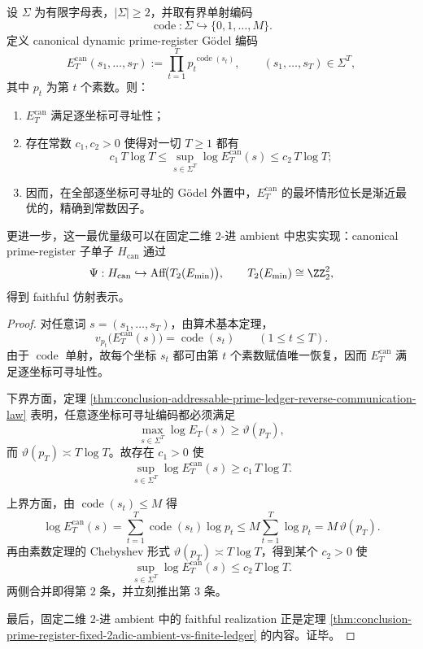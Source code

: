 \begin{theorem}\label{thm:conclusion-canonical-dynamic-prime-register-asymptotic-optimality}
设 \(\Sigma\) 为有限字母表，\(|\Sigma|\ge 2\)，并取有界单射编码
\[
\operatorname{code}:\Sigma\hookrightarrow \{0,1,\dots,M\}.
\]
定义 canonical dynamic prime-register Gödel 编码
\[
E_T^{\mathrm{can}}(s_1,\dots,s_T)
:=
\prod_{t=1}^{T}p_t^{\,\operatorname{code}(s_t)},
\qquad
(s_1,\dots,s_T)\in \Sigma^T,
\]
其中 \(p_t\) 为第 \(t\) 个素数。则：
\begin{enumerate}
  \item \(E_T^{\mathrm{can}}\) 满足逐坐标可寻址性；
  \item 存在常数 \(c_1,c_2>0\) 使得对一切 \(T\ge 1\) 都有
  \[
  c_1\,T\log T
  \le
  \sup_{s\in\Sigma^T}\log E_T^{\mathrm{can}}(s)
  \le
  c_2\,T\log T;
  \]
  \item 因而，在全部逐坐标可寻址的 Gödel 外置中，\(E_T^{\mathrm{can}}\) 的最坏情形位长是渐近最优的，精确到常数因子。
\end{enumerate}
更进一步，这一最优量级可以在固定二维 \(2\)-进 ambient 中忠实实现：canonical prime-register 子单子 \(H_{\mathrm{can}}\) 通过
\[
\Psi:H_{\mathrm{can}}\hookrightarrow \operatorname{Aff}\!\bigl(T_2(E_{\min})\bigr),
\qquad
T_2(E_{\min})\cong \ZZ_2^2,
\]
得到 faithful 仿射表示。
\end{theorem}
\begin{proof}
对任意词 \(s=(s_1,\dots,s_T)\)，由算术基本定理，
\[
v_{p_t}\!\bigl(E_T^{\mathrm{can}}(s)\bigr)=\operatorname{code}(s_t)
\qquad (1\le t\le T).
\]
由于 \(\operatorname{code}\) 单射，故每个坐标 \(s_t\) 都可由第 \(t\) 个素数赋值唯一恢复，因而 \(E_T^{\mathrm{can}}\) 满足逐坐标可寻址性。

下界方面，定理 \ref{thm:conclusion-addressable-prime-ledger-reverse-communication-law} 表明，任意逐坐标可寻址编码都必须满足
\[
\max_{s\in\Sigma^T}\log E_T(s)\ge \vartheta(p_T),
\]
而 \(\vartheta(p_T)\asymp T\log T\)。故存在 \(c_1>0\) 使
\[
\sup_{s\in\Sigma^T}\log E_T^{\mathrm{can}}(s)\ge c_1\,T\log T.
\]

上界方面，由 \(\operatorname{code}(s_t)\le M\) 得
\[
\log E_T^{\mathrm{can}}(s)
=
\sum_{t=1}^{T}\operatorname{code}(s_t)\log p_t
\le
M\sum_{t=1}^{T}\log p_t
=
M\,\vartheta(p_T).
\]
再由素数定理的 Chebyshev 形式 \(\vartheta(p_T)\asymp T\log T\)，得到某个 \(c_2>0\) 使
\[
\sup_{s\in\Sigma^T}\log E_T^{\mathrm{can}}(s)\le c_2\,T\log T.
\]
两侧合并即得第 \(2\) 条，并立刻推出第 \(3\) 条。

最后，固定二维 \(2\)-进 ambient 中的 faithful realization 正是定理 \ref{thm:conclusion-prime-register-fixed-2adic-ambient-vs-finite-ledger} 的内容。证毕。
\end{proof}

